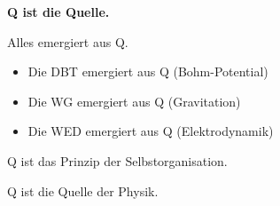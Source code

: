 \textbf{Q ist die Quelle.}

Alles emergiert aus Q.

\begin{itemize}
    \item Die DBT emergiert aus Q (Bohm-Potential)
    \item Die WG emergiert aus Q (Gravitation)
    \item Die WED emergiert aus Q (Elektrodynamik)
\end{itemize}

Q ist das Prinzip der Selbstorganisation.

Q ist die Quelle der Physik.